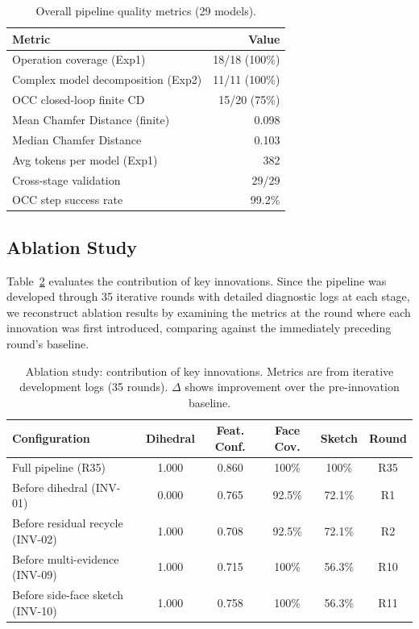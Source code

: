 \documentclass{styles/svproc}
\begin{document}
\begin{table}[t]
\caption{Overall pipeline quality metrics (29 models).}
\label{tab:metrics}
\centering
\begin{tabular}{lr}
\toprule
Metric & Value \\
\midrule
Operation coverage (Exp1) & 18/18 (100\%) \\
Complex model decomposition (Exp2) & 11/11 (100\%) \\
OCC closed-loop finite CD & 15/20 (75\%) \\
Mean Chamfer Distance (finite) & 0.098 \\
Median Chamfer Distance & 0.103 \\
Avg tokens per model (Exp1) & 382 \\
Cross-stage validation & 29/29 \\
OCC step success rate & 99.2\% \\
\bottomrule
\end{tabular}
\end{table}

\subsection{Ablation Study}

Table~\ref{tab:ablation} evaluates the contribution of key innovations. Since the pipeline was developed through 35 iterative rounds with detailed diagnostic logs at each stage, we reconstruct ablation results by examining the metrics at the round where each innovation was first introduced, comparing against the immediately preceding round's baseline.

\begin{table}[t]
\caption{Ablation study: contribution of key innovations. Metrics are from iterative development logs (35 rounds). $\Delta$ shows improvement over the pre-innovation baseline.}
\label{tab:ablation}
\centering
\small
\begin{tabular}{lccccc}
\toprule
Configuration & Dihedral & Feat. Conf. & Face Cov. & Sketch & Round \\
\midrule
Full pipeline (R35) & 1.000 & 0.860 & 100\% & 100\% & R35 \\
Before dihedral (INV-01) & 0.000 & 0.765 & 92.5\% & 72.1\% & R1 \\
Before residual recycle (INV-02) & 1.000 & 0.708 & 92.5\% & 72.1\% & R2 \\
Before multi-evidence (INV-09) & 1.000 & 0.715 & 100\% & 56.3\% & R10 \\
Before side-face sketch (INV-10) & 1.000 & 0.758 & 100\% & 56.3\% & R11 \\
\bottomrule
\end{tabular}
\end{table}
\end{document}
